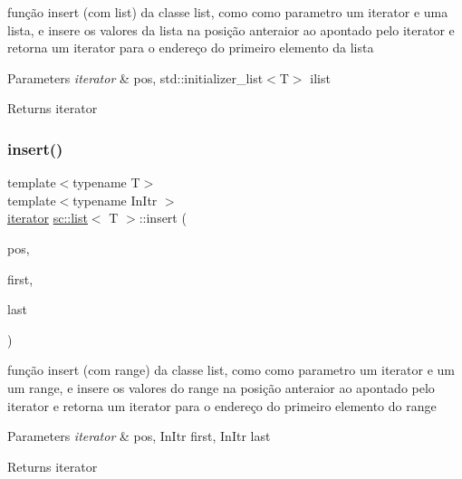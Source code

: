função insert (com list) da classe list, como como parametro um iterator e uma lista, e insere os valores da lista na posição anteraior ao apontado pelo iterator e retorna um iterator para o endereço do primeiro elemento da lista 
\begin{DoxyParams}{Parameters}
{\em iterator} & pos, std\+::initializer\+\_\+list$<$\+T$>$ ilist \\
\hline
\end{DoxyParams}
\begin{DoxyReturn}{Returns}
iterator 
\end{DoxyReturn}
\mbox{\label{classsc_1_1list_a50f5e86e5e8e4bce9ea2401a38a4719a}} 
\subsubsection{\texorpdfstring{insert()}{insert()}\hspace{0.1cm}{\footnotesize\ttfamily [3/7]}}
{\footnotesize\ttfamily template$<$typename T$>$ \\
template$<$typename In\+Itr $>$ \\
\mbox{\hyperlink{classsc_1_1list_1_1iterator}{iterator}} \mbox{\hyperlink{classsc_1_1list}{sc\+::list}}$<$ T $>$\+::insert (\begin{DoxyParamCaption}\item[{\mbox{\hyperlink{classsc_1_1list_1_1iterator}{iterator}}}]{pos,  }\item[{In\+Itr}]{first,  }\item[{In\+Itr}]{last }\end{DoxyParamCaption})}

função insert (com range) da classe list, como como parametro um iterator e um um range, e insere os valores do range na posição anteraior ao apontado pelo iterator e retorna um iterator para o endereço do primeiro elemento do range 
\begin{DoxyParams}{Parameters}
{\em iterator} & pos, In\+Itr first, In\+Itr last \\
\hline
\end{DoxyParams}
\begin{DoxyReturn}{Returns}
iterator 
\end{DoxyReturn}
\mbox{\label{classsc_1_1list_a31f318aea55ddfb39b23370c3a609400}} 
